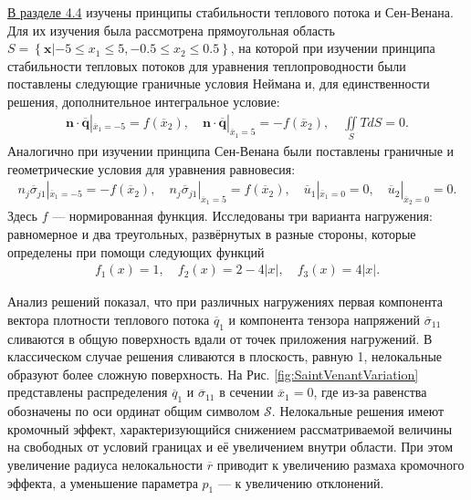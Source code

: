 \underline{В разделе 4.4} изучены принципы стабильности теплового потока и Сен-Венана. Для их изучения была рассмотрена прямоугольная область $S = \left\{ \boldsymbol{x} | -5 \leqslant x_1 \leqslant 5, -0.5 \leqslant x_2 \leqslant 0.5 \right\}$, на которой при изучении принципа стабильности тепловых потоков для уравнения теплопроводности были поставлены следующие граничные условия Неймана и, для единственности решения, дополнительное интегральное условие:
\begin{gather*}
	\boldsymbol{n} \cdot \overline{\boldsymbol{q}} |_{\overline{x}_1 = -5} = f(\overline{x}_2),
	\quad
	\boldsymbol{n} \cdot \overline{\boldsymbol{q}} |_{\overline{x}_1 = 5} = -f(\overline{x}_2),
	\quad
	\iint\limits_S T dS = 0.
\end{gather*}
Аналогично при изучении принципа Сен-Венана были поставлены граничные и геометрические условия для уравнения равновесия:
\begin{gather*}
	n_j \overline{\sigma}_{j1} |_{\overline{x}_1 = -5} = -f(\overline{x}_2),
	\quad
	n_j \overline{\sigma}_{j1} |_{\overline{x}_1 = 5} = f(\overline{x}_2),
	\quad
	\overline{u}_1 |_{\overline{x}_1 = 0} = 0,
	\quad
	\overline{u}_2 |_{\overline{x}_2 = 0} = 0.
\end{gather*}
Здесь $f$ --- нормированная функция. Исследованы три варианта нагружения: равномерное и два треугольных, развёрнутых в разные стороны, которые определены при помощи следующих функций
\begin{gather*}
	f_1 (x) = 1,
	\quad
	f_2 (x) = 2 - 4 |x|,
	\quad
	f_3 (x) = 4 |x|.
\end{gather*}

Анализ решений показал, что при различных нагружениях первая компонента вектора плотности теплового потока $\overline{q}_1$ и компонента тензора напряжений $\overline{\sigma}_{11}$ сливаются в общую поверхность вдали от точек приложения нагружений. В классическом случае решения сливаются в плоскость, равную 1, нелокальные образуют более сложную поверхность. На Рис. \ref{fig:SaintVenantVariation} представлены распределения $\overline{q}_1$ и $\overline{\sigma}_{11}$ в сечении $\overline{x}_1 = 0$, где из-за равенства обозначены по оси ординат общим символом $\mathcal{S}$. Нелокальные решения имеют кромочный эффект, характеризующийся снижением рассматриваемой величины на свободных от условий границах и её увеличением внутри области. При этом увеличение радиуса нелокальности $\overline{r}$ приводит к увеличению размаха кромочного эффекта, а уменьшение параметра $p_1$ --- к увеличению отклонений.

